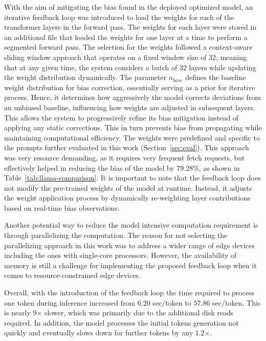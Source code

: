 With the aim of mitigating the bias found in the deployed optimized model, an iterative feedback loop was introduced to load the weights for each of the transformer layers in the forward pass. 
The weights for each layer were stored in an additional file that loaded the weights for one layer at a time to perform a segmented forward pass. 
The selection for the weights followed a context-aware sliding window approach that operates on a fixed window size of $32$, meaning that at any given time, the system considers a batch of $32$ layers while updating the weight distribution dynamically. 
The parameter $n_{base}$ defines the baseline weight distribution for bias correction, essentially serving as a prior for iterative process. Hence, it determines how aggressively the model corrects deviations from an unbiased baseline, influencing how weights are adjusted in subsequent layers. 
This allows the system to progressively refine its bias mitigation instead of applying any static corrections. This in turn prevents bias from propagating while maintaining computational efficiency. 
The weights were predefined and specific to the prompts further evaluated in this work (Section~\ref{sec:eval}). 
This approach was very resource demanding, as it requires very frequent fetch requests, but effectively helped in reducing the bias of the model by $79.28$\%, as shown in Table~\ref{tab:llama-comparison}. It is important to note that the feedback loop does not modify the pre-trained weights of the model at runtime. Instead, it adjusts the weight application process by dynamically re-weighting layer contributions based on real-time bias observations.

Another potential way to reduce the model intensive computation requirement is through parallelizing the computation. The reason for not selecting the parallelizing approach in this work was to address a wider range of edge devices including the ones with single-core processors. However, the availability of memory is still a challenge for implementing the proposed feedback loop when it comes to resource-constrained edge devices.

Overall, with the introduction of the feedback loop the time required to process one token during inference increased from $6.20$ sec/token to $57.86$ sec/token. This is nearly 9$\times$ slower, which was primarily due to the additional disk reads required. In addition, the model processes the initial tokens generation not quickly and eventually slows down for further tokens by any $1.2$$\times$. 



